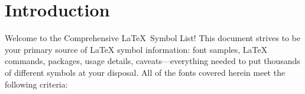 \documentclass{article}
\newcommand{\doctitle}{Comprehensive \LaTeX\ Symbol List}  %
\newcommand{\latex}{\LaTeX\index{LaTeX=\LaTeX}\xspace}
\newif\ifTX
\begin{document}
\ifTX
\index{circledplus=\texttt{\string\circledplus}|see{\texttt{\string\oplus}}}
\index{circledminus=\texttt{\string\circledminus}|see{\texttt{\string\ominus}}}
\index{circledtimes=\texttt{\string\circledtimes}|see{\texttt{\string\otimes}}}
\index{circledslash=\texttt{\string\circledslash}|see{\texttt{\string\oslash}}}
\index{circleddot=\texttt{\string\circleddot}|see{\texttt{\string\odot}}}
\index{le=\texttt{\string\le}|see{\texttt{\string\leq}}}
\index{ge=\texttt{\string\ge}|see{\texttt{\string\geq}}}
\index{gets=\texttt{\string\gets}|see{\texttt{\string\leftarrow}}}
\index{to=\texttt{\string\to}|see{\texttt{\string\rightarrow}}}
\index{owns=\texttt{\string\owns}|see{\texttt{\string\ni}}}
\index{lnot=\texttt{\string\lnot}|see{\texttt{\string\neg}}}
\index{land=\texttt{\string\land}|see{\texttt{\string\wedge}}}
\index{lor=\texttt{\string\lor}|see{\texttt{\string\vee}}}
\index{restriction=\texttt{\string\restriction}|see{\texttt{\string\upharpoonright}}}
\index{Doteq=\texttt{\string\Doteq}|see{\texttt{\string\doteqdot}}}
\index{doublecup=\texttt{\string\doublecup}|see{\texttt{\string\Cup}}}
\index{doublecap=\texttt{\string\doublecap}|see{\texttt{\string\Cap}}}
\index{llless=\texttt{\string\llless}|see{\texttt{\string\lll}}}
\index{gggtr=\texttt{\string\gggtr}|see{\texttt{\string\ggg}}}
\index{ne=\texttt{\string\ne}|see{\texttt{\string\neq}}}
\index{notowns=\texttt{\string\notowns}|see{\texttt{\string\notni}}}
\index{lrJoin=\texttt{\string\lrJoin}|see{\texttt{\string\Join}}}
\index{dasharrow=\texttt{\string\dasharrow}|see{\texttt{\string\dashrightarrow}}}
\index{circledotright=\texttt{\string\circledotright}|see{\texttt{\string\circleddotright}}}
\index{circledotleft=\texttt{\string\circledotleft}|see{\texttt{\string\circleddotleft}}}

\fi    %


\section{Introduction}

Welcome to the \doctitle!  This document strives to be your primary
source of \latex{} symbol information: font samples, \latex{}
commands, packages, usage details, caveats---everything needed to put
thousands of different symbols at your disposal.  All of the fonts
covered herein meet the following criteria:
\end{document}
